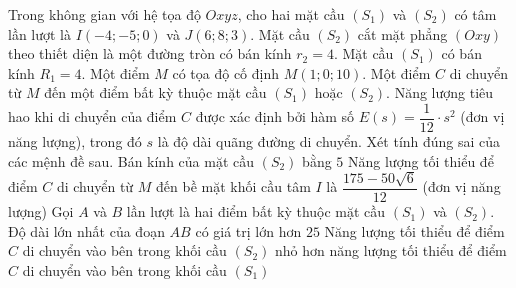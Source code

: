 \begin{ex}%
	Trong không gian với hệ tọa độ $Oxyz$, cho hai mặt cầu $(S_1)$ và $(S_2)$ có tâm lần lượt là $I(-4;-5;0)$ và $J(6;8;3)$.
	Mặt cầu $(S_2)$ cắt mặt phẳng $(Oxy)$ theo thiết diện là một đường tròn có bán kính $r_2 = 4$.
	Mặt cầu $(S_1)$ có bán kính $R_1 = 4$.
	Một điểm $M$ có tọa độ cố định $M(1;0;10)$.
	Một điểm $C$ di chuyển từ $M$ đến một điểm bất kỳ thuộc mặt cầu $(S_1)$ hoặc $(S_2)$.
	Năng lượng tiêu hao khi di chuyển của điểm $C$ được xác định bởi hàm số $E(s) = \dfrac{1}{12} \cdot s^2$ (đơn vị năng lượng), trong đó $s$ là độ dài quãng đường di chuyển.
	Xét tính đúng sai của các mệnh đề sau.
	\choiceTF
	{\True Bán kính của mặt cầu $(S_2)$ bằng $5$}
	{Năng lượng tối thiểu để điểm $C$ di chuyển từ $M$ đến bề mặt khối cầu tâm $I$ là $\dfrac{175 - 50\sqrt{6}}{12}$ (đơn vị năng lượng)}
	{\True Gọi $A$ và $B$ lần lượt là hai điểm bất kỳ thuộc mặt cầu $(S_1)$ và $(S_2)$. Độ dài lớn nhất của đoạn $AB$ có giá trị lớn hơn $25$}
	{\True Năng lượng tối thiểu để điểm $C$ di chuyển vào bên trong khối cầu $(S_2)$ nhỏ hơn năng lượng tối thiểu để điểm $C$ di chuyển vào bên trong khối cầu $(S_1)$}
\end{ex}
